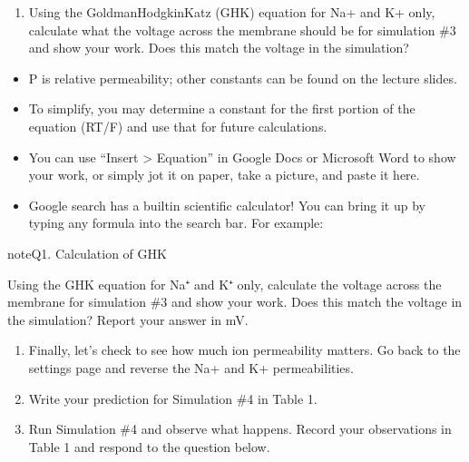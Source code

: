 \documentclass[letterpaper,10pt,english]{jupyterBook}
\begin{document}
\begin{enumerate}
%
\setcounter{enumi}{11}
\item {} 
\sphinxAtStartPar
Using the Goldman\sphinxhyphen{}Hodgkin\sphinxhyphen{}Katz (GHK) equation for Na+ and K+ only, calculate what the voltage across the membrane should be for simulation \#3 and show your work. Does this match the voltage in the simulation? 

\end{enumerate}

\sphinxAtStartPar
{}
\begin{itemize}
\item {} 
\sphinxAtStartPar
P is relative permeability; other constants can be found on the lecture slides.

\item {} 
\sphinxAtStartPar
To simplify, you may determine a constant for the first portion of the equation (RT/F) and use that for future calculations.

\item {} 
\sphinxAtStartPar
You can use “Insert > Equation” in Google Docs or Microsoft Word to show your work, or simply jot it on paper, take a picture, and paste it here.

\item {} 
\sphinxAtStartPar
Google search has a built\sphinxhyphen{}in scientific calculator! You can bring it up by typing any formula into the search bar. For example:

\sphinxAtStartPar
{}

\end{itemize}

\begin{sphinxadmonition}{note}{Q1. Calculation of GHK}

\sphinxAtStartPar
Using the GHK equation for Na⁺ and K⁺ only, calculate the voltage across the membrane for simulation \#3 and show your work. Does this match the voltage in the simulation? Report your answer in mV.
\end{sphinxadmonition}
\begin{enumerate}
%
\setcounter{enumi}{12}
\item {} 
\sphinxAtStartPar
Finally, let’s check to see how much ion permeability matters. Go back to the settings page and reverse the Na+ and K+ permeabilities.

\item {} 
\sphinxAtStartPar
Write your prediction for Simulation \#4 in Table 1.

\item {} 
\sphinxAtStartPar
Run Simulation \#4 and observe what happens. Record your observations in Table 1 and respond to the question below. 

\end{enumerate}
\end{document}
